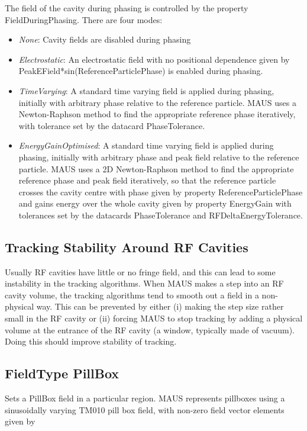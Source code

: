 The field of the cavity during phasing is controlled by the property FieldDuringPhasing. There are four modes:

\liststyleLxiv
\begin{itemize}
\item \textit{None}: Cavity fields are disabled during phasing
\item \textit{Electrostatic}: An electrostatic field with no positional dependence given by
PeakEField*sin(ReferenceParticlePhase) is enabled during phasing.
\item \textit{TimeVarying}: A standard time varying field is applied during phasing, initially with arbitrary phase
relative to the reference particle. MAUS uses a Newton-Raphson method to find the appropriate reference phase
iteratively, with tolerance set by the datacard PhaseTolerance.
\item \textit{EnergyGainOptimised}: A standard time varying field is applied during phasing, initially with arbitrary
phase and peak field relative to the reference particle. MAUS uses a 2D Newton-Raphson method to find the appropriate
reference phase and peak field iteratively, so that the reference particle crosses the cavity centre with phase given
by property ReferenceParticlePhase and gains energy over the whole cavity given by property EnergyGain with tolerances
set by the datacards PhaseTolerance and RFDeltaEnergyTolerance.
\end{itemize}
\subsection{Tracking Stability Around RF Cavities}
Usually RF cavities have little or no fringe field, and this can lead to some instability in the tracking algorithms.
When MAUS makes a step into an RF cavity volume, the tracking algorithms tend to smooth out a field in a non-physical
way. This can be prevented by either (i) making the step size rather small in the RF cavity or (ii) forcing MAUS to
stop tracking by adding a physical volume at the entrance of the RF cavity (a window, typically made of vacuum). Doing
this should improve stability of tracking.

\subsection{FieldType PillBox}
Sets a PillBox field in a particular region. MAUS represents pillboxes using a sinusoidally varying TM010 pill box
field, with non-zero field vector elements given by

